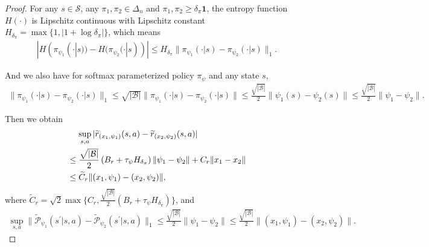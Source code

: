 \documentclass{article}
\theoremstyle{plain}
\theoremstyle{definition}
\theoremstyle{remark}
\def\cB{\mathcal B}
\def\cP{\mathcal P}
\def\cS{\mathcal S}
\begin{document}
\begin{proof}
    For any $s\in\cS$, any $\pi_1,\pi_2 \in \Delta_n$ and $\pi_1,\pi_2 \geq \delta_\pi \mathbf{1}$, the entropy function $H(\cdot)$ is Lipschitz continuous with Lipschitz constant $H_{\delta_\pi} = \max \{1, |1+\log \delta_\pi|\}$, which means
    \begin{align}
        |H(\pi_{\psi_1}(\cdot|s)) - H(\pi_{\psi_2}(\cdot|s))  | \leq H_{\delta_\pi} \| \pi_{\psi_1}(\cdot|s) - \pi_{\psi_2}(\cdot|s) \|_1 .
    \end{align}

    And we also have for softmax parameterized policy $\pi_\psi$ and any state $s$,
    \begin{align}
        \|\pi_{\psi_1}(\cdot|s) - \pi_{\psi_2}(\cdot|s) \|_1 \leq \sqrt{|\cB|}\|\pi_{\psi_1}(\cdot|s) - \pi_{\psi_2}(\cdot|s) \| \leq \frac{\sqrt{|\cB|}}{2} \| \psi_1(s) - \psi_2(s) \| \leq \frac{\sqrt{|\cB|}}{2} \| \psi_1 - \psi_2 \|.
    \end{align}

    Then we obtain
    \begin{align}
        & \quad\, \sup_{s,a} | \widetilde{r}_{(x_1,\psi_1)}(s,a) - \widetilde{r}_{(x_2,\psi_2)}(s,a) | \notag \\
         & \leq \frac{\sqrt{|\cB|}}{2} \left( B_r + \tau_\psi H_{\delta_\pi} \right)  \| \psi_1 - \psi_2 \| + C_r \| x_1 - x_2 \| \notag \\
         & \leq \widetilde{C}_r \|(x_1,\psi_1) - (x_2,\psi_2)\| ,
    \end{align}
    where $\widetilde{C}_r = \sqrt{2} \max\{ C_r, \frac{\sqrt{|\cB|}}{2} ( B_r + \tau_\psi H_{\delta_\pi} ) \}$,
    and 
    \begin{align}
         \sup_{s,a} \| \widetilde{\cP}_{\psi_1}(s^\prime|s,a) - \widetilde{\cP}_{\psi_2}(s^\prime|s,a)\|_1 \leq \frac{\sqrt{|\cB|}}{2} \| \psi_1 - \psi_2 \| \leq \frac{\sqrt{|\cB|}}{2} \|(x_1,\psi_1) - (x_2,\psi_2)\| .
    \end{align}


\end{proof}
\end{document}
